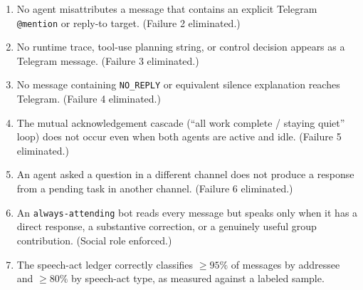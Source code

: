 \documentclass[11pt]{article}
\begin{document}
\begin{enumerate}
\item No agent misattributes a message that contains an explicit Telegram
\texttt{@mention} or reply-to target.  (Failure 2 eliminated.)
\item No runtime trace, tool-use planning string, or control decision
appears as a Telegram message.  (Failure 3 eliminated.)
\item No message containing \texttt{NO\_REPLY} or equivalent silence
explanation reaches Telegram.  (Failure 4 eliminated.)
\item The mutual acknowledgement cascade (``all work complete / staying
quiet'' loop) does not occur even when both agents are active and idle.
(Failure 5 eliminated.)
\item An agent asked a question in a different channel does not produce a
response from a pending task in another channel.  (Failure 6 eliminated.)
\item An \texttt{always-attending} bot reads every message but speaks only
when it has a direct response, a substantive correction, or a genuinely
useful group contribution.  (Social role enforced.)
\item The speech-act ledger correctly classifies $\geq 95\%$ of messages
by addressee and $\geq 80\%$ by speech-act type, as measured against a
labeled sample.
\end{enumerate}
\end{document}
